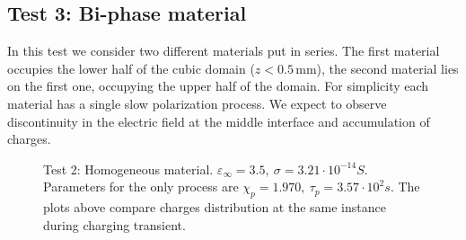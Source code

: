 \documentclass[11pt,a4paper]{article}
\begin{document}
\subsection{Test 3: Bi-phase material}
In this test we consider two different materials put in series. The first material occupies the lower half of the cubic domain (\(z<0.5\,\)mm), the second material lies on the first one, occupying the upper half of the domain. For simplicity each material has a single slow polarization process. We expect to observe discontinuity in the electric field at the middle interface and accumulation of charges.
\begin{figure}
	\hspace*{-0.01\textwidth}
	\hspace*{0.01\textwidth}
	\caption{Test 2: Homogeneous material. \(\varepsilon_\infty = 3.5,\ \sigma = 3.21\cdot 10^{-14}S\). Parameters for the only process are \(\chi_p = 1.970,\ \tau_p = 3.57\cdot 10^{2}s\). The plots above compare charges distribution at the same instance during charging transient.}
	\label{fig:test2}
	
\end{figure}
\end{document}
